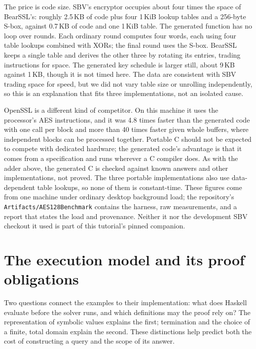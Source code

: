 \documentclass[review]{jfp-epi}
\newcommand{\code}[1]{\texttt{#1}}
\begin{document}
The price is code size. SBV's encryptor occupies about four times the space of
BearSSL's: roughly 2.5\,KB of code plus four 1\,KiB lookup tables and a 256-byte
S-box, against 0.7\,KB of code and one 1\,KiB table. The generated function has no
loop over rounds. Each ordinary round computes four words, each using four table
lookups combined with XORs; the final round uses the S-box. BearSSL keeps a single table and derives
the other three by rotating its entries, trading instructions for space. The
generated key schedule is larger still, about 9\,KB against 1\,KB, though it is
not timed here. The data are consistent with SBV trading space for speed, but we
did not vary table size or unrolling independently, so this is an explanation
that fits three implementations, not an isolated cause.

OpenSSL is a different kind of competitor. On this machine it uses the
processor's AES instructions, and it was 4.8 times faster than the generated code
with one call per block and more than 40 times faster given whole buffers, where
independent blocks can be processed together. Portable C should not be expected
to compete with dedicated hardware; the generated code's advantage is that it
comes from a specification and runs wherever a C compiler does. As with the adder
above, the generated C is checked against known answers and other
implementations, not proved. The three portable implementations also use
data-dependent table lookups, so none of them is constant-time. These figures
come from one machine under ordinary desktop background load; the repository's
\code{Artifacts/AES128Benchmark} contains the harness, raw measurements, and a
report that states the load and provenance. Neither it nor the development SBV
checkout it used is part of this tutorial's pinned companion.

\section{The execution model and its proof obligations}
\label{sec:hood}

Two questions connect the examples to their implementation: what does Haskell
evaluate before the solver runs, and which definitions may the proof rely on?
The representation of symbolic values explains the first; termination and the
choice of a finite, total domain explain the second. These distinctions help
predict both the cost of constructing a query and the scope of its answer.
\end{document}
